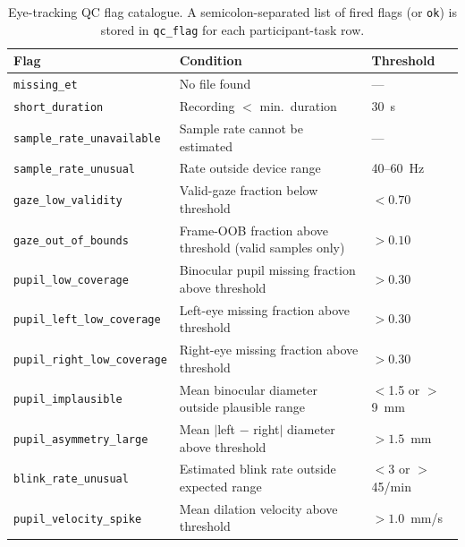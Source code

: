 \begin{table}[t]
  \centering
  \caption{Eye-tracking QC flag catalogue.
           A semicolon-separated list of fired flags (or \texttt{ok})
           is stored in \texttt{qc\_flag} for each participant-task row.}
  \label{tab:et_qc_flags}
  \small
  \begin{tabular}{lp{7cm}l}
    \toprule
    \textbf{Flag} & \textbf{Condition} & \textbf{Threshold} \\
    \midrule
    \texttt{missing\_et}           & No file found                                          & ---               \\
    \texttt{short\_duration}        & Recording $<$ min.\ duration                           & 30~s              \\
    \texttt{sample\_rate\_unavailable} & Sample rate cannot be estimated                     & ---               \\
    \texttt{sample\_rate\_unusual}  & Rate outside device range                              & 40--60~Hz         \\
    \texttt{gaze\_low\_validity}    & Valid-gaze fraction below threshold                    & $< 0.70$          \\
    \texttt{gaze\_out\_of\_bounds}  & Frame-OOB fraction above threshold (valid samples only)& $> 0.10$          \\
    \texttt{pupil\_low\_coverage}   & Binocular pupil missing fraction above threshold       & $> 0.30$          \\
    \texttt{pupil\_left\_low\_coverage}  & Left-eye missing fraction above threshold         & $> 0.30$          \\
    \texttt{pupil\_right\_low\_coverage} & Right-eye missing fraction above threshold        & $> 0.30$          \\
    \texttt{pupil\_implausible}     & Mean binocular diameter outside plausible range        & $<$1.5 or $>$9~mm \\
    \texttt{pupil\_asymmetry\_large}& Mean $|$left $-$ right$|$ diameter above threshold    & $> 1.5$~mm        \\
    \texttt{blink\_rate\_unusual}   & Estimated blink rate outside expected range            & $<$3 or $>$45/min \\
    \texttt{pupil\_velocity\_spike} & Mean dilation velocity above threshold                 & $> 1.0$~mm/s      \\
    \bottomrule
  \end{tabular}
\end{table}

